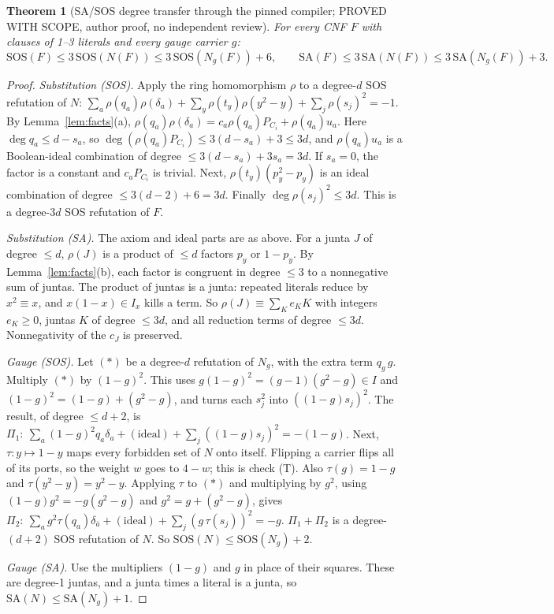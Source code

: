 \documentclass[11pt]{article}
\newtheorem{theorem}{Theorem}
\theoremstyle{definition}
\newcommand{\SOS}{\mathrm{SOS}}
\newcommand{\SA}{\mathrm{SA}}
\begin{document}
\begin{theorem}[SA/SOS degree transfer through the pinned compiler; PROVED WITH SCOPE, author proof, no independent review]\label{thm:sos}
For every CNF $F$ with clauses of 1--3 literals and every gauge carrier $g$:
\[\SOS(F)\le 3\,\SOS(N(F))\le 3\,\SOS(N_g(F))+6,\qquad \SA(F)\le 3\,\SA(N(F))\le3\,\SA(N_g(F))+3.\]
\end{theorem}
\begin{proof}
\emph{Substitution (SOS).} Apply the ring homomorphism $\rho$ to a degree-$d$ SOS refutation of $N$:
$\sum_a\rho(q_a)\rho(\delta_a)+\sum_y\rho(t_y)\rho(y^2-y)+\sum_j\rho(s_j)^2=-1$. By Lemma~\ref{lem:facts}(a), $\rho(q_a)\rho(\delta_a)=c_a\rho(q_a)P_{C_i}+\rho(q_a)u_a$. Here $\deg q_a\le d-s_a$, so $\deg(\rho(q_a)P_{C_i})\le3(d-s_a)+3\le3d$, and $\rho(q_a)u_a$ is a Boolean-ideal combination of degree $\le3(d-s_a)+3s_a=3d$. If $s_a=0$, the factor is a constant and $c_aP_{C_i}$ is trivial. Next, $\rho(t_y)(p_y^2-p_y)$ is an ideal combination of degree $\le3(d-2)+6=3d$. Finally $\deg\rho(s_j)^2\le3d$. This is a degree-$3d$ SOS refutation of $F$.

\emph{Substitution (SA).} The axiom and ideal parts are as above. For a junta $J$ of degree $\le d$, $\rho(J)$ is a product of $\le d$ factors $p_y$ or $1-p_y$. By Lemma~\ref{lem:facts}(b), each factor is congruent in degree $\le3$ to a nonnegative sum of juntas. The product of juntas is a junta: repeated literals reduce by $x^2\equiv x$, and $x(1-x)\in I_x$ kills a term. So $\rho(J)\equiv\sum_K e_K K$ with integers $e_K\ge0$, juntas $K$ of degree $\le3d$, and all reduction terms of degree $\le3d$. Nonnegativity of the $c_J$ is preserved.

\emph{Gauge (SOS).} Let $(*)$ be a degree-$d$ refutation of $N_g$, with the extra term $q_g\,g$. Multiply $(*)$ by $(1-g)^2$. This uses $g(1-g)^2=(g-1)(g^2-g)\in I$ and $(1-g)^2=(1-g)+(g^2-g)$, and turns each $s_j^2$ into $((1-g)s_j)^2$. The result, of degree $\le d+2$, is
$\Pi_1:\ \sum_a(1-g)^2q_a\delta_a+(\text{ideal})+\sum_j((1-g)s_j)^2=-(1-g)$.
Next, $\tau:y\mapsto1-y$ maps every forbidden set of $N$ onto itself. Flipping a carrier flips all of its ports, so the weight $w$ goes to $4-w$; this is check (T). Also $\tau(g)=1-g$ and $\tau(y^2-y)=y^2-y$. Applying $\tau$ to $(*)$ and multiplying by $g^2$, using $(1-g)g^2=-g(g^2-g)$ and $g^2=g+(g^2-g)$, gives
$\Pi_2:\ \sum_a g^2\tau(q_a)\delta_{\bar a}+(\text{ideal})+\sum_j(g\,\tau(s_j))^2=-g$.
$\Pi_1+\Pi_2$ is a degree-$(d+2)$ SOS refutation of $N$. So $\SOS(N)\le\SOS(N_g)+2$.

\emph{Gauge (SA).} Use the multipliers $(1-g)$ and $g$ in place of their squares. These are degree-1 juntas, and a junta times a literal is a junta, so $\SA(N)\le\SA(N_g)+1$.
\end{proof}
\end{document}
